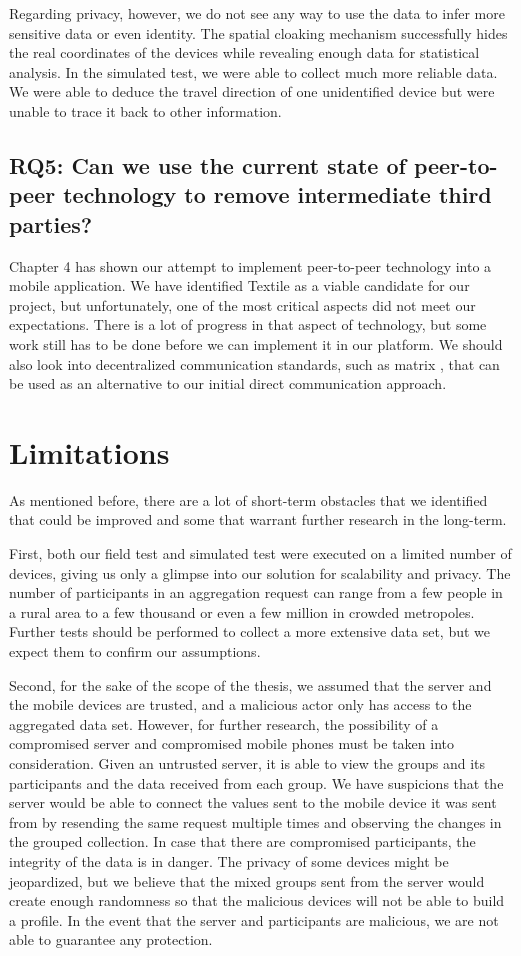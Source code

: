Regarding privacy, however, we do not see any way to use the data to infer more sensitive data or even identity. The spatial cloaking mechanism successfully hides the real coordinates of the devices while revealing enough data for statistical analysis. In the simulated test, we were able to collect much more reliable data. We were able to deduce the travel direction of one unidentified device but were unable to trace it back to other information.

\subsection*{RQ5: Can we use the current state of peer-to-peer technology to remove intermediate third parties?}
Chapter 4 has shown our attempt to implement peer-to-peer technology into a mobile application. We have identified Textile as a viable candidate for our project, but unfortunately, one of the most critical aspects did not meet our expectations. There is a lot of progress in that aspect of technology, but some work still has to be done before we can implement it in our platform. We should also look into decentralized communication standards, such as matrix \cite{matrix}, that can be used as an alternative to our initial direct communication approach.

\section{Limitations}
As mentioned before, there are a lot of short-term obstacles that we identified that could be improved and some that warrant further research in the long-term.

First, both our field test and simulated test were executed on a limited number of devices, giving us only a glimpse into our solution for scalability and privacy. The number of participants in an aggregation request can range from a few people in a rural area to a few thousand or even a few million in crowded metropoles. Further tests should be performed to collect a more extensive data set, but we expect them to confirm our assumptions.

Second, for the sake of the scope of the thesis, we assumed that the server and the mobile devices are trusted, and a malicious actor only has access to the aggregated data set. However, for further research, the possibility of a compromised server and compromised mobile phones must be taken into consideration. Given an untrusted server, it is able to view the groups and its participants and the data received from each group. We have suspicions that the server would be able to connect the values sent to the mobile device it was sent from by resending the same request multiple times and observing the changes in the grouped collection. In case that there are compromised participants, the integrity of the data is in danger. The privacy of some devices might be jeopardized, but we believe that the mixed groups sent from the server would create enough randomness so that the malicious devices will not be able to build a profile. In the event that the server and participants are malicious, we are not able to guarantee any protection.

